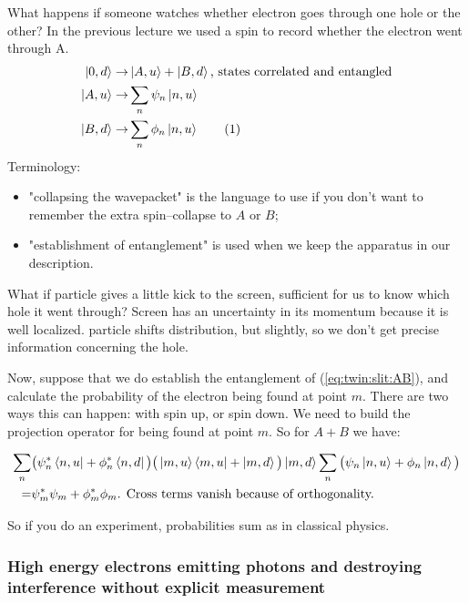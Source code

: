 \documentclass[]{article}
\newcommand\numberthis{\addtocounter{equation}{1}\tag{\theequation}}
\begin{document}
What happens if someone watches whether electron goes through one hole or the other? In the previous lecture we used a spin to record whether the electron went through A.
\begin{align*}
	\ket{0,d}\rightarrow& \ket{A,u} + \ket{B,d} \text{, states correlated and entangled}\\
	\ket{A,u} \rightarrow& \sum_n \psi_n \ket{n,u}\\
	\ket{B,d} \rightarrow& \sum_n \phi_n \ket{n,u} \numberthis \label{eq:twin:slit:AB}
\end{align*}
Terminology:
\begin{itemize}
	\item "collapsing the wavepacket" is the language to use if you don't want to remember the extra spin--collapse to $A$ or $B$;
	\item "establishment of entanglement" is used when we keep the apparatus in our description.
\end{itemize}
What if particle gives a little kick to the screen, sufficient for us to know which hole it went through? Screen has an uncertainty in its momentum because it is well localized. particle shifts distribution, but slightly, so we don't get precise information concerning the hole.

Now, suppose that we do establish the entanglement of (\ref{eq:twin:slit:AB}), and calculate the probability of the electron being found at point $m$. There are two ways this can happen: with spin up, or spin down. We need to build the projection operator for being found at point $m$. So for $A+B$ we have:

\begin{align*}
	\sum_n&\big(\psi_n^* \bra{n,u}+\phi_n^*\bra{n,d}\big)\big(\ket{m,u}\bra{m,u} + \ket{m,d}\big)\ket{m,d} \sum_n\big(\psi_n \ket{n,u}+\phi_n\ket{n,d}\big)\\
	=& \psi_m^* \psi_m +\phi_m^* \phi_m \text{. Cross terms vanish because of orthogonality.}
\end{align*}

So if you do an experiment, probabilities sum as in classical physics.

\subsubsection{High energy electrons emitting photons and destroying interference without explicit measurement} 
\end{document}
